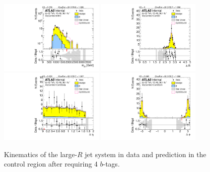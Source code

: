 \begin{figure}[htbp!]
\begin{center}
\includegraphics[width=0.45\textwidth,angle=-90]{figures/boosted/Control/b77_FourTag_Control_mHH_l_1.pdf}
\includegraphics[width=0.45\textwidth,angle=-90]{figures/boosted/Control/b77_FourTag_Control_hCandDr.pdf}\\
\includegraphics[width=0.45\textwidth,angle=-90]{figures/boosted/Control/b77_FourTag_Control_hCandDeta.pdf}
\includegraphics[width=0.45\textwidth,angle=-90]{figures/boosted/Control/b77_FourTag_Control_hCandDphi.pdf}
  \caption{Kinematics of the large-$R$ jet system in data and prediction in the control region after requiring 4 $b$-tags.  }
  \label{fig:boosted-4b-control-ak10-system}
\end{center}
\end{figure}


